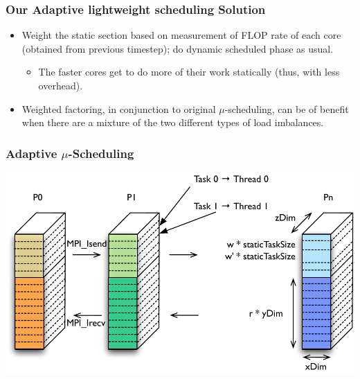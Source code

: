 \begin{frame}
\frametitle{Our Adaptive lightweight scheduling Solution}
\begin{itemize} 
\item \small Weight the static section based on measurement of FLOP
rate of each core (obtained from previous timestep); do dynamic 
scheduled phase as usual.  

\begin{itemize} 
    \item {\small The faster cores get to do more of their work
      statically (thus, with less overhead).}  
\end{itemize}  




\item \small Weighted factoring, in conjunction to 
original $\mu$-scheduling, can be of benefit when 
there are a mixture of the two different types of 
load imbalances. 

\end{itemize} 
\end{frame} 

\begin{frame}
\frametitle{Adaptive $\mu$-Scheduling}
\includegraphics[width=\textwidth]{images/weighted_decomp} 
\end{frame}  

